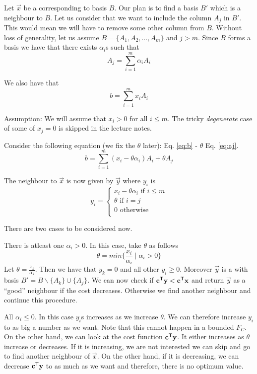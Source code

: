 \documentclass[12pt,
    driverfallback=dvipdfm,
 	openany,
    a4paper,
    toc=bibliography,
    twoside,
    numbers=noenddot]{book}              %
\begin{document}
Let $\vec x$ be a \BFS corresponding to basis $B$. Our plan is to find a basis $B'$ which is a neighbour to $B$. Let us consider that we want to include the column $A_j$ in $B'$. This would mean we will have to remove some other column from $B$. Without loss of generality, let us assume $B = \{A_1,A_2,\dots,A_m\}$ and $j>m$. Since $B$ forms a basis we have that there exists $\alpha_i$s such that
\begin{equation}
\label{eq:aj}
A_j = \sum_{i=1}^m \alpha_i A_i
\end{equation}

We also have that
\begin{equation}
\label{eq:b}
b = \sum_{i=1}^m x_i A_i
\end{equation}

\begin{mdframed}[backgroundcolor=light-gray, linecolor=light-gray]
Assumption: We will assume that $x_i > 0$ for all $i \leq m$. The tricky \emph{degenerate} case of some of $x_j=0$ is skipped in the lecture notes.
\end{mdframed}

Consider the following equation (we fix the $\theta$ later): Eq. \ref{eq:b} - $\theta$ Eq. \ref{eq:aj}.
\[
b = \sum_{i=1}^m (x_i - \theta \alpha_i) A_i + \theta A_j
\]

The neighbour \BFS to $\vec x$ is now given by $\vec y$ where $y_i$ is
\[
y_{i} = \begin{cases}
x_i - \theta \alpha_i \text{ if } i \leq m \\
\theta \text{ if } i = j \\
0 \text{ otherwise} \\
\end{cases}
\]

There are two cases to be considered now.

 There is atleast one $\alpha_i > 0$. In this case, take $\theta$ as follows
\[
\theta = min \{\frac{x_i}{\alpha_i} \mid \alpha_i > 0 \}
\]
Let $\theta = \frac{x_k}{\alpha_k}$. Then we have that $y_k = 0$ and all other $y_i \geq 0$. Moreover $\vec y$ is a \BFS with basis 
$B' = B \backslash \{A_k\} \cup \{A_j\}$. We can now check if ${\mathbf c}^{\mathsf{T}} \mathbf y < {\mathbf c}^{\mathsf{T}} \mathbf x$ and return $\vec y$ as a ``good'' neighbour if the cost decreases. Otherwise we find another neighbour and continue this procedure.

 All $\alpha_i \leq 0$. In this case $y_i$s increases as we increase $\theta$. We can therefore increase $y_i$ to as big a number as we want. Note that this cannot happen in a bounded $F_C$. On the other hand, we can look at the cost function ${\mathbf c}^{\mathsf{T}} \mathbf y$. It either increases as $\theta$ increase or decreases. If it is increasing, we are not interested we can skip and go to find another neighbour of $\vec x$. On the other hand, if it is decreasing, we can decrease ${\mathbf c}^{\mathsf{T}} \mathbf y$ to as much as we want and therefore, there is no optimum value. 
\end{document}
